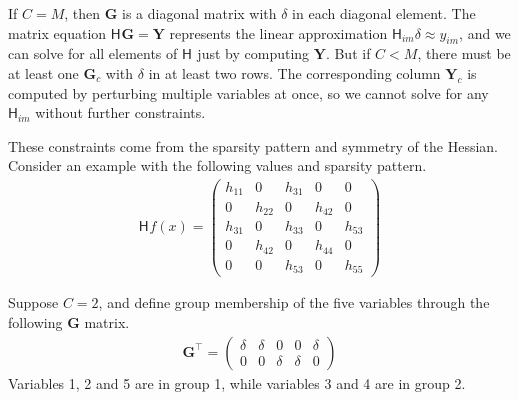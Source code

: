 \documentclass[jss]{jss}\usepackage[]{graphicx}\usepackage[]{color}
\newcommand{\hess}[2]{\mathsf{H}_{#1}#2}
\newcommand{\Mat}[1]{\mathbf{#1}}
\begin{document}
If $C=M$, then $\Mat{G}$ is a diagonal matrix with $\delta$ in each
diagonal element.  The matrix equation $\hess{}{}\Mat{G}=\Mat{Y}$ represents the linear approximation
$\hess{im}{}\delta\approx y_{im}$, and we can solve for all elements of $\hess{}{}$
just by computing $\Mat{Y}$. But if $C<M$,
there must be at least one $\Mat{G}_c$ with $\delta$ in at least two
rows. The corresponding column $\Mat{Y}_c$ is computed by perturbing multiple variables at
once, so we cannot solve for any $\hess{im}{}$
without further constraints.

These constraints come from the sparsity pattern and symmetry
of the Hessian. Consider an example with the following values and
sparsity pattern.
\begin{align}
  \label{eq:7}
 \hess{}{f(x)}= \begin{pmatrix}
    h_{11}&0&h_{31}&0&0\\
    0&h_{22}&0&h_{42}&0\\
    h_{31}&0&h_{33}&0&h_{53}\\
    0&h_{42}&0&h_{44}&0\\
    0&0&h_{53}&0&h_{55}
  \end{pmatrix}
\end{align}

Suppose $C=2$, and define group membership of the five variables through the following $\Mat{G}$ matrix.
\begin{align}
  \label{eq:7}
 \Mat{G}^\top= \begin{pmatrix}
 \delta&\delta&0&0&\delta\\
 0&0&\delta&\delta&0
 \end{pmatrix}
\end{align}
Variables 1, 2 and 5 are in group 1, while variables 3 and 4 are in
group 2.
\end{document}
